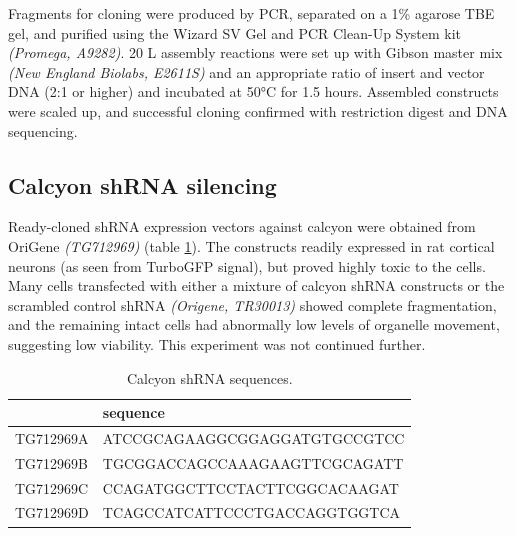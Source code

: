 \documentclass[
  12pt,
  a4paper,
]{book}
\begin{document}
Fragments for cloning were produced by PCR, separated on a 1\% agarose TBE gel, and purified using the Wizard SV Gel and PCR Clean-Up System kit \emph{(Promega, A9282)}. 20 \textmu{}L assembly reactions were set up with Gibson master mix \emph{(New England Biolabs, E2611S)} and an appropriate ratio of insert and vector DNA (2:1 or higher) and incubated at 50°C for 1.5 hours. Assembled constructs were scaled up, and successful cloning confirmed with restriction digest and DNA sequencing.

\begin{table}
\centering
\caption{\label{tab:primer-table}Gibson cloning primers.}
\centering
{}
\end{table}

\subsection{Calcyon shRNA silencing}\label{calcyon-shrna-silencing}

Ready-cloned shRNA expression vectors against calcyon were obtained from OriGene \emph{(TG712969)} (table \ref{tab:caly-tab}). The constructs readily expressed in rat cortical neurons (as seen from TurboGFP signal), but proved highly toxic to the cells. Many cells transfected with either a mixture of calcyon shRNA constructs or the scrambled control shRNA \emph{(Origene, TR30013)} showed complete fragmentation, and the remaining intact cells had abnormally low levels of organelle movement, suggesting low viability. This experiment was not continued further.

\begin{table}

\caption{\label{tab:caly-tab}Calcyon shRNA sequences.}
\centering
\begin{tabular}[t]{ll}
\toprule
  & sequence\\
\midrule
TG712969A & ATCCGCAGAAGGCGGAGGATGTGCCGTCC\\
TG712969B & TGCGGACCAGCCAAAGAAGTTCGCAGATT\\
TG712969C & CCAGATGGCTTCCTACTTCGGCACAAGAT\\
TG712969D & TCAGCCATCATTCCCTGACCAGGTGGTCA\\
\bottomrule
\end{tabular}
\end{table}
\end{document}
